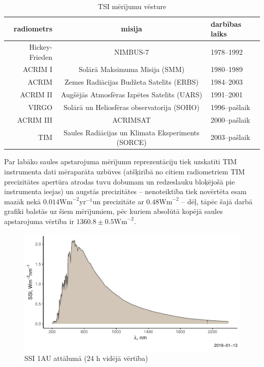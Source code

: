 \begin{table}[h]
    \caption{TSI mērījumu vēsture} %
    \begin{center}
    \begin{tabular}{| r | c | l |}
    \hline
    radiometrs & misija & darbības laiks \\ \hline
    Hickey-Frieden & NIMBUS-7 & 1978--1992  \\ \hline
	ACRIM I & Solārā Maksimuma Misija (SMM) & 1980--1989 \\ \hline
	ACRIM  & Zemes Radiācijas Budžeta Satelīts (ERBS) & 1984--2003 \\ \hline
	ACRIM II & Augšējās Atmosfēras Izpētes Satelīts (UARS) & 1991--2001 \\ \hline
	VIRGO & Solārā un Heliosfēras observatorija (SOHO)& 1996--pašlaik \\ \hline
	ACRIM III & ACRIMSAT  & 2000--pašlaik \\ \hline
	TIM & Saules Radiācijas un Klimata Eksperiments (SORCE) & 2003--pašlaik\\ \hline
    \end{tabular}
    \end{center}
    \label{tab:radiometers}
\end{table}

Par labāko saules apstarojuma mērījumu reprezentāciju tiek uzskatīti TIM instrumenta dati mēraparāta uzbūves (atšķirībā no citiem radiometriem TIM precizitātes apertūra atrodas tuvu dobumam un redzeslauku bloķējošā pie instrumenta ieejas) un augstās precizitātes -- nenoteiktība tiek novērtēta esam mazāk nekā $0.014\textrm{Wm}^{-2}\textrm{yr}^{-1}$un precizitāte ar $0.48\textrm{Wm}^{-2}$ \cite{TSIdata} -- dēļ, tāpēc šajā darbā grafiki balstās uz šiem mērījumiem, pēc kuriem absolūtā kopējā saules apstarojuma vērtība ir $1360.8 \pm 0.5 \textrm{Wm}^{-2}$.\cite{Frohlich2012}

\begin{figure}[h]
    \centering
    \includegraphics[width=\linewidth]{figures/misc/SSI.pdf}
    \caption{SSI 1AU attālumā (24 h vidējā vērtība) \cite{SSIdata}}
    \label{fig:SSI}
\end{figure}

